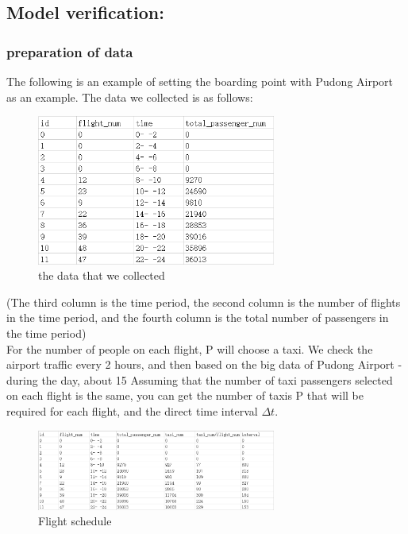 \subsection{Model verification:}
\subsubsection{preparation of data}
    The following is an example of setting the boarding point with Pudong Airport as an example.
The data we collected is as follows:



\begin{figure}[H]
\centering
\includegraphics[width=0.7\textwidth]{figures/Data_31.png}
\caption{the data that we collected}
\label{fig:label}
\end{figure}
(The third column is the time period, the second column is the number of flights in the time period, and the fourth column is the total number of passengers in the time period)\\
\indent For the number of people on each flight, P will choose a taxi. We check the airport traffic every 2 hours, and then based on the big data of Pudong Airport - during the day, about 15%
Assuming that the number of taxi passengers selected on each flight is the same, you can get the number of taxis P that will be required for each flight, and the direct time interval $\Delta t$.

\begin{figure}[H]
\centering
\includegraphics[width=0.7\textwidth]{figures/data3_2.png}
\caption{Flight schedule}
\label{fig:label}
\end{figure}


